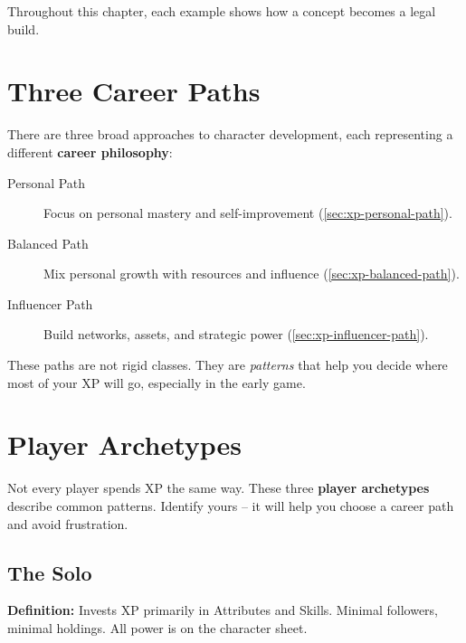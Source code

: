 Throughout this chapter, each example shows how a concept becomes a legal build.


\section{Three Career Paths}
\label{sec:xp-three-paths}

There are three broad approaches to character development, each representing a
different \textbf{career philosophy}:

\begin{description}
\item[Personal Path] Focus on personal mastery and self-improvement (\ref{sec:xp-personal-path}).
\item[Balanced Path] Mix personal growth with resources and influence (\ref{sec:xp-balanced-path}).
\item[Influencer Path] Build networks, assets, and strategic power (\ref{sec:xp-influencer-path}).
\end{description}

These paths are not rigid classes. They are \emph{patterns} that help you
decide where most of your XP will go, especially in the early game.


\section{Player Archetypes}
\label{sec:player-archetypes}

Not every player spends XP the same way. These three \textbf{player archetypes}
describe common patterns. Identify yours -- it will help you choose a career
path and avoid frustration.

\subsection*{The Solo}
\label{sec:archetype-solo}

\textbf{Definition:} Invests XP primarily in Attributes and Skills. Minimal
followers, minimal holdings. All power is on the character sheet.

